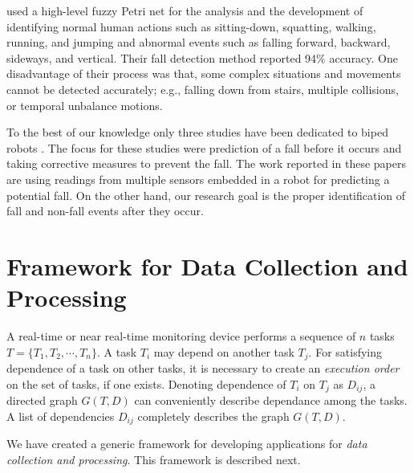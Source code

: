 \documentclass[]{IEEEtran}
\begin{document}
\cite{ShenFallDetectionPhone2015} used a  high-level fuzzy Petri net for the analysis and the development of 
identifying normal human actions such as sitting-down, squatting, walking, running, and jumping and 
abnormal events such as falling forward, backward, sideways, and vertical. Their fall detection 
method reported 94\% accuracy. One disadvantage of their process was that, some complex situations 
and movements cannot be detected accurately; e.g., falling down from  stairs, multiple collisions, 
or temporal unbalance motions.

\par 
To the 
best of our knowledge only three studies have been dedicated to biped robots \cite{Andre2015,Goswami2014,Moya2015}. The focus for these studies were prediction of a fall before it occurs and taking corrective measures to prevent the fall. The work reported in these papers are using readings from multiple sensors embedded in a robot for predicting a potential fall. On the other hand, our research goal is the proper identification of fall and non-fall events after they occur.






\section{Framework for Data Collection and Processing}
\label{sec:framework}

A real-time or near real-time monitoring device performs a sequence of $n$ tasks $T = \{ T_1, T_2,\cdots,T_n\}$. A task $T_i$ may depend on another task $T_j$.  For satisfying dependence of a task on other tasks, it is necessary to create an \emph{execution order} on the set of tasks, if one exists. Denoting dependence of $T_i$ on $T_j$ as $D_{ij}$, a directed graph $G(T,D)$ can conveniently describe dependance among the tasks. A list of dependencies $D_{ij}$ completely describes the graph $G(T,D)$.
\par
We have created a generic framework for developing applications for \emph{data collection and processing}. This framework is described next.
\end{document}
